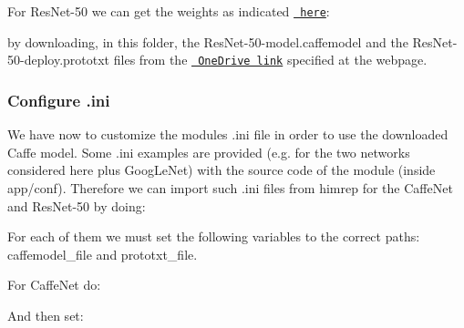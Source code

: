 For {\ttfamily Res\+Net-\/50} we can get the weights as indicated \href{https://github.com/KaimingHe/deep-residual-networks}{\texttt{ here}}\+:


\begin{DoxyCode}{0}
\end{DoxyCode}


by downloading, in this folder, the {\ttfamily Res\+Net-\/50-\/model.\+caffemodel} and the {\ttfamily Res\+Net-\/50-\/deploy.\+prototxt} files from the \href{https://onedrive.live.com/?authkey=%21AAFW2-FVoxeVRck&id=4006CBB8476FF777%2117887&cid=4006CBB8476FF777}{\texttt{ One\+Drive link}} specified at the webpage.

\subsubsection*{Configure .ini}

We have now to customize the module\textquotesingle{}s {\ttfamily .ini} file in order to use the downloaded Caffe model. Some {\ttfamily .ini} examples are provided (e.\+g. for the two networks considered here plus {\ttfamily Goog\+Le\+Net}) with the source code of the module (inside {\ttfamily app/conf}). Therefore we can import such {\ttfamily .ini} files from {\ttfamily himrep} for the {\ttfamily Caffe\+Net} and {\ttfamily Res\+Net-\/50} by doing\+:


\begin{DoxyCode}{0}
\end{DoxyCode}


For each of them we must set the following variables to the correct paths\+: {\ttfamily caffemodel\+\_\+file} and {\ttfamily prototxt\+\_\+file}.

For {\ttfamily Caffe\+Net} do\+:


\begin{DoxyCode}{0}
\end{DoxyCode}


And then set\+:


\begin{DoxyCode}{0}
\end{DoxyCode}


